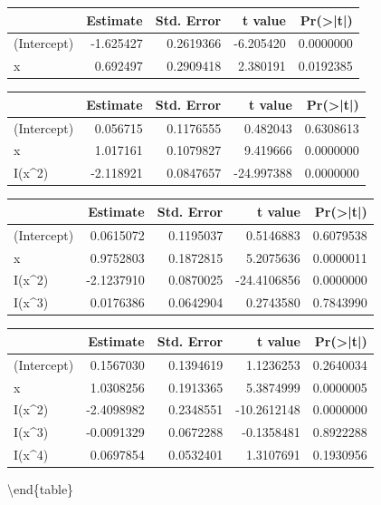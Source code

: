 \documentclass[
]{article}
\begin{document}
\centering
\begin{tabular}[t]{l|r|r|r|r}
\hline
  & Estimate & Std. Error & t value & Pr(>|t|)\\
\hline
(Intercept) & -1.625427 & 0.2619366 & -6.205420 & 0.0000000\\
\hline
x & 0.692497 & 0.2909418 & 2.380191 & 0.0192385\\
\hline
\end{tabular}
\centering
\begin{tabular}[t]{l|r|r|r|r}
\hline
  & Estimate & Std. Error & t value & Pr(>|t|)\\
\hline
(Intercept) & 0.056715 & 0.1176555 & 0.482043 & 0.6308613\\
\hline
x & 1.017161 & 0.1079827 & 9.419666 & 0.0000000\\
\hline
I(x\textasciicircum{}2) & -2.118921 & 0.0847657 & -24.997388 & 0.0000000\\
\hline
\end{tabular}
\centering
\begin{tabular}[t]{l|r|r|r|r}
\hline
  & Estimate & Std. Error & t value & Pr(>|t|)\\
\hline
(Intercept) & 0.0615072 & 0.1195037 & 0.5146883 & 0.6079538\\
\hline
x & 0.9752803 & 0.1872815 & 5.2075636 & 0.0000011\\
\hline
I(x\textasciicircum{}2) & -2.1237910 & 0.0870025 & -24.4106856 & 0.0000000\\
\hline
I(x\textasciicircum{}3) & 0.0176386 & 0.0642904 & 0.2743580 & 0.7843990\\
\hline
\end{tabular}
\centering
\begin{tabular}[t]{l|r|r|r|r}
\hline
  & Estimate & Std. Error & t value & Pr(>|t|)\\
\hline
(Intercept) & 0.1567030 & 0.1394619 & 1.1236253 & 0.2640034\\
\hline
x & 1.0308256 & 0.1913365 & 5.3874999 & 0.0000005\\
\hline
I(x\textasciicircum{}2) & -2.4098982 & 0.2348551 & -10.2612148 & 0.0000000\\
\hline
I(x\textasciicircum{}3) & -0.0091329 & 0.0672288 & -0.1358481 & 0.8922288\\
\hline
I(x\textasciicircum{}4) & 0.0697854 & 0.0532401 & 1.3107691 & 0.1930956\\
\hline
\end{tabular}

\textbackslash end\{table\}
\end{document}

